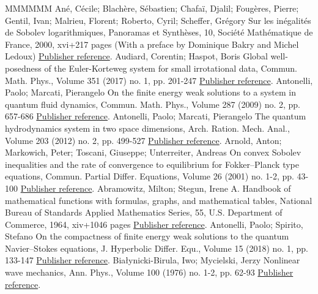 \documentclass[11pt]{article}
\theoremstyle{definition}
\numberwithin{equation}{section}
\numberwithin{figure}{section}
\numberwithin{table}{section}
\newcommand*\<{\left\langle}
\renewcommand*\>{\right\rangle}
\begin{document}
\begin{thebibliography}{MMMMMM}
 Ané, Cécile; Blachère, Sébastien; Chafaï, Djalil; Fougères, Pierre; Gentil, Ivan; Malrieu, Florent; Roberto, Cyril; Scheffer, Grégory Sur les inégalités de Sobolev logarithmiques, Panoramas et Synthèses, 10, Société Mathématique de France, 2000, xvi+217 pages (With a preface by Dominique Bakry and Michel Ledoux) \href{https://ahl.centre-mersenne.org/item/AHL_2018__1__47_0/#LogSob}{Publisher reference}.
 Audiard, Corentin; Haspot, Boris Global well-posedness of the Euler-Korteweg system for small irrotational data, Commun. Math. Phys., Volume 351 (2017) no. 1, pp. 201-247 \href{https://ahl.centre-mersenne.org/item/AHL_2018__1__47_0/#AuHa17}{Publisher reference}.
 Antonelli, Paolo; Marcati, Pierangelo On the finite energy weak solutions to a system in quantum fluid dynamics, Commun. Math. Phys., Volume 287 (2009) no. 2, pp. 657-686 \href{https://ahl.centre-mersenne.org/item/AHL_2018__1__47_0/#AnMa09}{Publisher reference}.
 Antonelli, Paolo; Marcati, Pierangelo The quantum hydrodynamics system in two space dimensions, Arch. Ration. Mech. Anal., Volume 203 (2012) no. 2, pp. 499-527 \href{https://ahl.centre-mersenne.org/item/AHL_2018__1__47_0/#AnMa12}{Publisher reference}.
 Arnold, Anton; Markowich, Peter; Toscani, Giuseppe; Unterreiter, Andreas On convex Sobolev inequalities and the rate of convergence to equilibrium for Fokker–Planck type equations, Commun. Partial Differ. Equations, Volume 26 (2001) no. 1-2, pp. 43-100 \href{https://ahl.centre-mersenne.org/item/AHL_2018__1__47_0/#AMTU01}{Publisher reference}.
 Abramowitz, Milton; Stegun, Irene A. Handbook of mathematical functions with formulas, graphs, and mathematical tables, National Bureau of Standards Applied Mathematics Series, 55, U.S. Department of Commerce, 1964, xiv+1046 pages \href{https://ahl.centre-mersenne.org/item/AHL_2018__1__47_0/#AbSt64}{Publisher reference}.
 Antonelli, Paolo; Spirito, Stefano On the compactness of finite energy weak solutions to the quantum Navier–Stokes equations, J. Hyperbolic Differ. Equ., Volume 15 (2018) no. 1, pp. 133-147 \href{https://ahl.centre-mersenne.org/item/AHL_2018__1__47_0/#AS-comp}{Publisher reference}.
 Białynicki-Birula, Iwo; Mycielski, Jerzy Nonlinear wave mechanics, Ann. Phys., Volume 100 (1976) no. 1-2, pp. 62-93 \href{https://ahl.centre-mersenne.org/item/AHL_2018__1__47_0/#BiMy76}{Publisher reference}.

\end{thebibliography}
\end{document}
